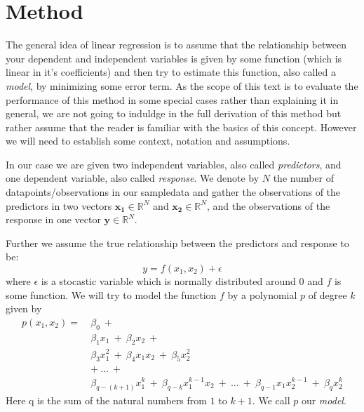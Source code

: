 \documentclass[a4paper,norsk]{article}
\begin{document}
\section{Method}
The general idea of linear regression is to assume that the relationship 
between your dependent and independent variables is given by some function 
(which is linear in it's coefficients)
and then try to estimate this function, also called a \textit{model}, 
by minimizing some error term. As the scope of this text is to evaluate the
performance of this method in some special cases rather than explaining it 
in general, we are not going to induldge in the full derivation 
of this method but rather assume that the reader is familiar with the 
basics of this concept. However we will need to establish some context, 
notation and assumptions.
\par
In our case we are given two independent variables, also called 
\textit{predictors}, 
and one dependent variable, also called 
\textit{response}. We denote by 
$N$ the number of 
datapoints/observations in our sampledata and gather the observations 
of the predictors in two vectors $\bm{x_1} \in \mathbb{R}^N$ and 
$\bm{x_2} \in \mathbb{R}^N$, and the observations of the response in one 
vector $\bm{y} \in \mathbb{R}^N$.
\par
Further we assume the true relationship between the predictors and 
response to be:
\begin{equation}
    y = f(x_1, x_2) + \epsilon
\end{equation}
where $\epsilon$ is a stocastic variable which is normally distributed 
around 0 and $f$ is some function. 
We will try to model the function $f$ by a polynomial $p$ of degree $k$ 
given by 
\begin{equation}
    \begin{split}
        p(x_1, x_2) = \ &\beta_0 \ + \\ 
        & \beta_1 x_1 \ + \ \beta_2 x_2 \ + \\
        & \beta_3 x_1^2 \ + \ \beta_4 x_1 x_2 \ + \ \beta_5 x_2^2 \\
        & + \ \dots \ + \\
        & \beta_{q-(k+1)} x_1^k \ + \ \beta_{q-k} x_1^{k-1} x_2 \ 
        + \ \dots \ + \ \beta_{q-1} x_1 x_2^{k-1} \ + \ \beta_q x_2^k
    \end{split}
\end{equation}
Here q is the sum of the natural numbers from $1$ to $k + 1$. We call
$p$ our \textit{model}.
\par
\end{document}
